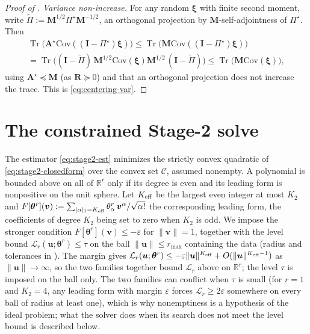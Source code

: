 \documentclass[review,hidelinks,onefignum,onetabnum]{siamart251216}
\newcommand{\RR}{\mathbb{R}}
\newcommand{\Cov}{\mathrm{Cov}}
\newcommand{\tr}{\operatorname{Tr}}
\newcommand{\mA}{\bm{A}}
\newcommand{\mI}{\bm{I}}
\newcommand{\mR}{\bm{R}}
\newcommand{\vbeta}{\bm{\theta}^{r}}
\newcommand{\vu}{\bm{u}}
\newcommand{\vv}{\bm{v}}
\newcommand{\scL}{\mathcal{L}}
\begin{document}
\begin{proof}[Proof of ]
\emph{Variance non-increase.} For any random $\bm\xi$ with finite second moment, write $\widetilde\Pi := \bm M^{1/2}\Pi^\star\bm M^{-1/2}$, an orthogonal projection by $\bm M$-self-adjointness of $\Pi^\star$. Then
\begin{multline*}
  \tr\bigl(\mA^\star\Cov((\mI-\Pi^\star)\bm\xi)\bigr) \le \tr\bigl(\bm M\Cov((\mI-\Pi^\star)\bm\xi)\bigr) \\
  = \tr\bigl((\mI-\widetilde\Pi)\,\bm M^{1/2}\Cov(\bm\xi)\bm M^{1/2}\,(\mI-\widetilde\Pi)\bigr) \le \tr\bigl(\bm M\Cov(\bm\xi)\bigr),
\end{multline*}
using $\mA^\star \preceq \bm M$ (as $\mR \succeq 0$) and that an orthogonal projection does not increase the trace. This is \eqref{eq:centering-var}.
\end{proof}


\section{The constrained Stage-2 solve}
\label{app:solver}

The estimator \eqref{eq:stage2-est} minimizes the strictly convex quadratic of \eqref{eq:stage2-closedform} over the convex set $\mathcal C$, assumed nonempty. A polynomial is bounded above on all of $\RR^r$ only if its degree is even and its leading form is nonpositive on the unit sphere. Let $K_{\rm eff}$ be the largest even integer at most $K_2$ and $F[\vbeta](\vv) := \sum_{|\alpha|_1 = K_{\rm eff}}\theta^r_\alpha\,\vv^\alpha/\sqrt{\alpha!}$ the corresponding leading form, the coefficients of degree $K_2$ being set to zero when $K_2$ is odd. We impose the stronger condition $F[\vbeta](\vv) \le -\varepsilon$ for $\|\vv\| = 1$, together with the level bound $\scL_r(\vu;\vbeta) \le \tau$ on the ball $\|\vu\| \le r_{\max}$ containing the data (radius and tolerances in ). The margin gives $\scL_r(\vu;\vbeta) \le -\varepsilon\|\vu\|^{K_{\rm eff}} + O(\|\vu\|^{K_{\rm eff}-1})$ as $\|\vu\|\to\infty$, so the two families together bound $\scL_r$ above on $\RR^r$; the level $\tau$ is imposed on the ball only. The two families can conflict when $\tau$ is small (for $r = 1$ and $K_2 = 4$, any leading form with margin $\varepsilon$ forces $\scL_r \ge 2\varepsilon$ somewhere on every ball of radius at least one), which is why nonemptiness is a hypothesis of the ideal problem; what the solver does when its search does not meet the level bound is described below.
\end{document}
